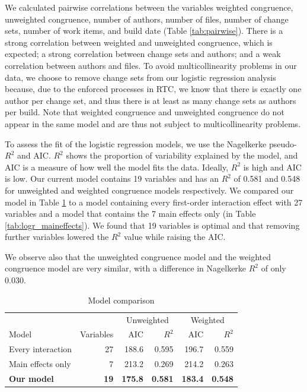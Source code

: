 We calculated pairwise correlations between the variables weighted congruence, unweighted congruence, number of authors, number of files, number of change sets, number of work items, and build date (Table \ref{tab:pairwise}). There is a strong correlation between weighted and unweighted congruence, which is expected; a strong correlation between change sets and authors; and a weak correlation between authors and files. To avoid multicollinearity problems in our data, we choose to remove change sets from our logistic regression analysis because, due to the enforced processes in RTC, we know that there is exactly one author per change set, and thus there is at least as many change sets as authors per build. Note that weighted congruence and unweighted congruence do not appear in the same model and are thus not subject to multicollinearity problems.

To assess the fit of the logistic regression models, we use the Nagelkerke pseudo-$R^2$ and AIC. $R^2$ shows the proportion of variability explained by the model, and AIC is a measure of how well the model fits the data. Ideally, $R^2$ is high and AIC is low. Our current model contains 19 variables and has an $R^2$ of 0.581 and 0.548 for unweighted and weighted congruence models respectively. We compared our model in Table \ref{tab:models} to a model containing every first-order interaction effect with 27 variables and a model that contains the 7 main effects only (in Table \ref{tab:logr_maineffects}). We found that 19 variables is optimal and that removing further variables lowered the $R^2$ value while raising the AIC.

We observe also that the unweighted congruence model and the weighted congruence model are very similar, with a difference in Nagelkerke $R^2$ of only 0.030.

\begin{table}
\begin{center}
\begin{tabular}{l|r|rr|rr}

             & & \multicolumn{2}{c|}{Unweighted} & \multicolumn{2}{c}{Weighted} \\
Model                  & Variables    & AIC & $R^2$                       & AIC & $R^2$                      \\ \hline
Every interaction  & 27  & 188.6 & 0.595 & 196.7 & 0.559 \\
Main effects only & 7   & 213.2 & 0.269 & 214.2 & 0.263 \\
\textbf{Our model}         & \textbf{19}  & \textbf{175.8} & \textbf{0.581} & \textbf{183.4} & \textbf{0.548} \\
\hline
\end{tabular}
\end{center}
\caption{Model comparison}
\label{tab:models}
\end{table}



